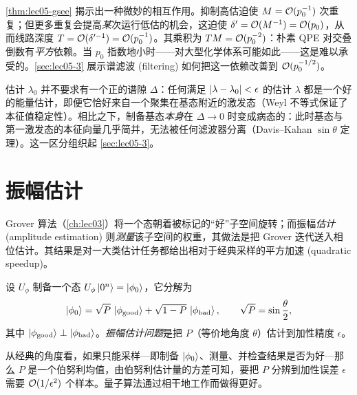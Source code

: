\begin{remark}[交叠 $p_0$ 是瓶颈]
\label{rem:lec05-overlap}
\cref{thm:lec05-gsee} 揭示出一种微妙的相互作用。抑制高估迫使 $M=\mathcal{O}(p_0^{-1})$ 次重复；但更多重复会提高\emph{某}次运行低估的机会，这迫使 $\delta'=\mathcal{O}(M^{-1})=\mathcal{O}(p_0)$，从而线路深度 $T=\mathcal{O}(\delta'^{-1})=\mathcal{O}(p_0^{-1})$。其乘积为
$TM=\mathcal{O}(p_0^{-2})$：朴素 QPE 对交叠倒数有\emph{平方}依赖。当 $p_0$ 指数地小时——对大型化学体系可能如此——这是难以承受的。\cref{sec:lec05-3} 展示谱滤波 (filtering) 如何把这一依赖改善到 $\mathcal{O}(p_0^{-1/2})$。
\end{remark}

\begin{remark}[能量估计不需要谱隙]
\label{rem:lec05-nogap}
估计 $\lambda_0$ 并不要求有一个正的谱隙 $\Delta$：任何满足 $\left\lvert \lambda-\lambda_0 \right\rvert<\epsilon$ 的估计 $\lambda$ 都是一个好的能量估计，即便它恰好来自一个聚集在基态附近的激发态（Weyl 不等式保证了本征值稳定性）。相比之下，制备基态\emph{本身}在 $\Delta\to0$ 时变成病态的：此时基态与第一激发态的本征向量几乎简并，无法被任何滤波器分离（Davis--Kahan $\sin\theta$ 定理）。这一区分组织起 \cref{sec:lec05-3}。
\end{remark}
\section{振幅估计}
\label{sec:lec05-2}

Grover 算法（\cref{ch:lec03}）将一个态朝着被标记的``好''子空间旋转；而振幅\emph{估计} (amplitude estimation) 则\emph{测量}该子空间的权重，其做法是把 Grover 迭代送入相位估计。其结果是对一大类估计任务都给出相对于经典采样的平方加速 (quadratic speedup)。

\begin{definition}[振幅估计]
\label{def:lec05-ae}
设 $U_{\phi}$ 制备一个态 $U_{\phi}\ket{0^n}=\ket{\phi_0}$，它分解为
\begin{equation}
  \ket{\phi_0}=\sqrt{P}\,\ket{\phi_{\mathrm{good}}}
              +\sqrt{1-P}\,\ket{\phi_{\mathrm{bad}}},
  \qquad \sqrt{P}=\sin\frac{\theta}{2},
  \label{eq:lec05-aedecomp}
\end{equation}
其中 $\ket{\phi_{\mathrm{good}}}\perp\ket{\phi_{\mathrm{bad}}}$。\emph{振幅估计问题}是把 $P$（等价地角度 $\theta$）估计到加性精度 $\epsilon$。
\end{definition}

从经典的角度看，如果只能采样---即制备 $\ket{\phi_0}$、测量、并检查结果是否为好---那么 $P$ 是一个伯努利均值，由伯努利估计量的方差可知，要把 $P$ 分辨到加性误差 $\epsilon$ 需要 $\mathcal{O}(1/\epsilon^2)$ 个样本。量子算法通过相干地工作而做得更好。

